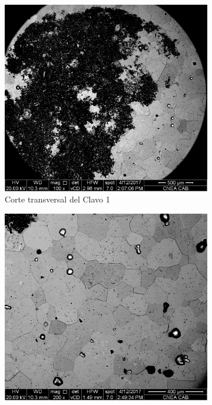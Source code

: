 \documentclass[a4paper,12pt,fleqn,twoside,openany]{book}
\begin{document}
\begin{figure}
\begin{subfigure}{0.2\textwidth}
        \includegraphics[width=\textwidth]{Img/Resultados/clavos/Clavo1Retro.jpg}
        \caption{Corte transversal del Clavo 1}
        \label{fig:MicroClavo1}
    \end{subfigure}
        \begin{subfigure}{0.2\textwidth}
        \includegraphics[width=\textwidth]{Img/Resultados/clavos/Clavo1Retro2.jpg}

\end{subfigure}
\end{figure}
\end{document}
